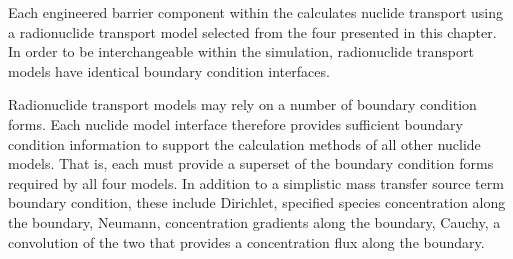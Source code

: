 Each engineered barrier component within the \Cyder calculates 
nuclide transport using a radionuclide transport model selected from the four presented in this 
chapter. In order to be interchangeable within the simulation, radionuclide 
transport models have identical boundary condition interfaces. 

Radionuclide transport models may rely on a number of boundary condition forms.  
Each nuclide model interface therefore provides sufficient boundary condition 
information to support the calculation methods of all other nuclide models. That 
is, each must provide a superset of the boundary condition forms required by all 
four models. In addition to a simplistic mass transfer source term boundary 
condition, these include Dirichlet, specified species concentration along the 
boundary, Neumann, concentration gradients along the boundary, Cauchy, a 
convolution of the two that provides a concentration flux along the boundary.
